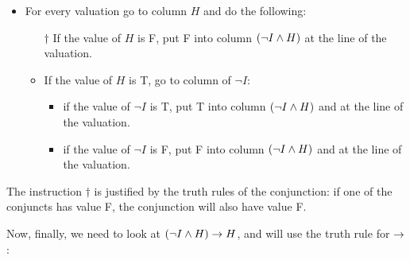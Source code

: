 \begin{itemize}
\item  For every valuation go to column $H$ and do the following:
\begin{itemize}
\item[$\dagger$]  If the value of $H$ is F, put F into column $(\neg I\mathbin{\wedge} H)$ at the line of the valuation.
\item If the value of $H$ is T, go to column of $\neg I$:
\begin{itemize}
\item if the value of $\neg I$ is T, put T into column $(\neg I\mathbin{\wedge} H)$ and at the line of the valuation.
\item if the value of $\neg I$ is F, put F into column $(\neg I\mathbin{\wedge} H)$ and at the line of the valuation.
 \end{itemize}
 \end{itemize}
 \end{itemize}
The instruction $\dagger$ is justified by the truth rules of the conjunction: if one of the conjuncts has value F, the conjunction will also have value F.

Now, finally, we need to look at $(\neg I\mathbin{\wedge} H)\rightarrow H$, and will use the truth rule for $\rightarrow$:

